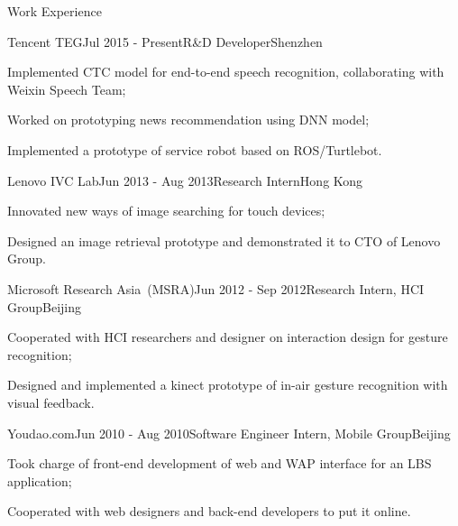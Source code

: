 \documentclass{cv_professional-en} %
\begin{document}

\begin{rSection}{Work Experience}
    
\begin{rSubsection}{Tencent TEG}{Jul 2015 - Present}{R\&D Developer}{Shenzhen}
	\item Implemented CTC model for end-to-end speech recognition, collaborating with Weixin Speech Team;
	\item Worked on prototyping news recommendation using DNN model;
	\item Implemented a prototype of service robot based on ROS/Turtlebot.
\end{rSubsection}

    
\begin{rSubsection}{Lenovo IVC Lab}{Jun 2013 - Aug 2013}{Research Intern}{Hong Kong}
    \item Innovated new ways of image searching for touch devices;
    \item Designed an image retrieval prototype and demonstrated it to CTO of Lenovo Group.
\end{rSubsection}

\begin{rSubsection}{Microsoft Research Asia~(MSRA)}{Jun 2012 - Sep 2012}{Research Intern, HCI Group}{Beijing}
    \item Cooperated with HCI researchers and designer on interaction design for gesture recognition;
    \item Designed and implemented a kinect prototype of in-air gesture recognition with visual feedback.
\end{rSubsection}

\begin{rSubsection}{Youdao.com}{Jun 2010 - Aug 2010}{Software Engineer Intern, Mobile Group}{Beijing}
    \item Took charge of front-end development of web and WAP interface for an LBS application;
    \item Cooperated with web designers and back-end developers to put it online.
\end{rSubsection}

\end{rSection}
\end{document}
